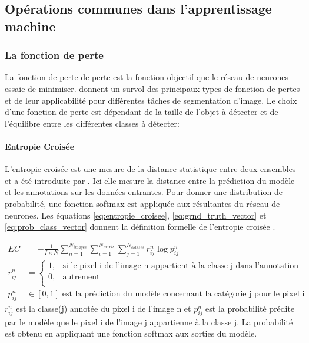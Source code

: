   \subsection{Opérations communes dans l'apprentissage machine}
    \subsubsection{La fonction de perte}
      La fonction de perte de perte est la fonction objectif que le réseau de neurones essaie de minimiser. \textcite{Azad:LossFunctions:2023, Jadon:SurveyLoss:2020} donnent un survol des principaux types de fonction de pertes et de leur applicabilité pour différentes tâches de segmentation d'image. Le choix d'une fonction de perte est dépendant de la taille de l'objet à détecter et de l'équilibre entre les différentes classes à détecter:\par
      \paragraph{Entropie Croisée} L'entropie croisée est une mesure de la distance statistique entre deux ensembles et a été introduite par \textcite{Shannon:MathematicalTheory:1948}. Ici elle mesure la distance entre la prédiction du modèle et les annotations sur les données entrantes. Pour donner une distribution de probabilité, une fonction softmax est appliquée aux résultantes du réseau de neurones.
      Les équations \ref{eq:entropie_croisee}, \ref{eq:grnd_truth_vector} et \ref{eq:prob_class_vector} donnent la définition formelle de l'entropie croisée \parencite{Wallach:DeepLearning:2024}.\par
      \begin{align}
        EC & = -\frac{1}{I \times N} \sum_{n=1}^{N_{images}}\sum_{i=1}^{N_{pixels}}\sum_{j=1}^{N_{classes}}r^{n}_{ij} \log{p^{n}_{ij}} \label{eq:entropie_croisee}\\
        r^{n}_{ij} & = \begin{cases}
          1,& \mbox{si le pixel i de l'image n appartient à la classe j dans l'annotation d'entrainement}\\
          0,& \mbox{autrement}\\ \end{cases}\label{eq:grnd_truth_vector}\\
        p^{n}_{ij} & \in [0,1]\mbox{ est la prédiction du modèle concernant la catégorie j pour le pixel i}\label{eq:prob_class_vector}
      \end{align}
      $r^{n}_{ij}$ est la classe(j) annotée du pixel i de l'image n et $p^{n}_{ij}$ est la probabilité prédite par le modèle que le pixel i de l'image j appartienne à la classe j. La probabilité est obtenu en appliquant une fonction softmax aux sorties du modèle. 
